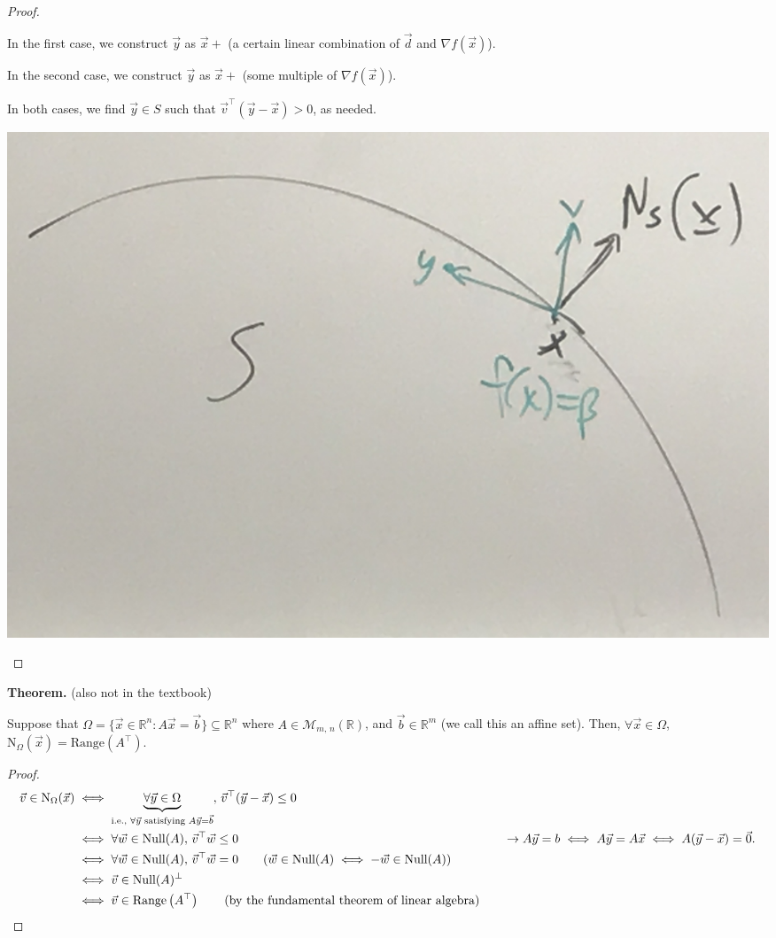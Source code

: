 \documentclass{article}
\newcommand{\R}{\mathbb{R}}
\begin{document}
\begin{proof}
\begin{enumerate}[label=(\alph*)]
        In the first case, we construct $\vec{y}$ as $\vec{x} + $ (a certain linear combination of $\vec{d}$ and $\nabla f(\vec{x})$).

        In the second case, we construct $\vec{y}$ as $\vec{x} + $ (some multiple of $\nabla f(\vec{x})$).

        In both cases, we find $\vec{y} \in S$ such that $\vec{v}^\top(\vec{y} - \vec{x}) > 0$, as needed.

        \begin{center}
            \includegraphics[scale=0.08]{IMG_2388.JPG}
        \end{center}
    \end{enumerate}
\end{proof}

\textbf{Theorem.} (also not in the textbook)

Suppose that $\Omega = \{\vec{x} \in \R^n : A\vec{x} = \vec{b}\} \subseteq \R^n$ where $A \in \mathcal{M}_{m,\, n}(\R)$, and $\vec{b} \in \R^m$ (we call this an affine set). Then, $\forall \vec{x} \in \Omega$, $\text{N}_{\Omega}(\vec{x}) = \text{Range}\left(A^\top\right)$.

\begin{proof}
    \begin{align*}
        \vec{v} \in \text{N}_{\Omega}(\vec{x}) &\iff \underbrace{\forall \vec{y} \in \Omega}_{\text{i.e., } \forall \vec{y} \text{ satisfying } A\vec{y} = \vec{b}},\, \vec{v}^\top(\vec{y} - \vec{x}) \leq 0 \\
        &\iff \forall \vec{w} \in \text{Null}(A),\, \vec{v}^\top\vec{w} \leq 0
        &\hspace{12pt} \rightarrow A\vec{y} = b \iff A\vec{y} = A\vec{x} \iff A(\vec{y} - \vec{x}) = \vec{0}. \\
        &\iff \forall \vec{w} \in \text{Null}(A),\, \vec{v}^\top\vec{w} = 0 \tag{$\vec{w} \in \text{Null}(A) \iff -\vec{w} \in \text{Null}(A)$} \\
        &\iff \vec{v} \in \text{Null}(A)^\bot \\
        &\iff \vec{v} \in \text{Range}\left(A^\top\right) \tag{by the fundamental theorem of linear algebra}
    \end{align*}
\end{proof}
\end{document}
